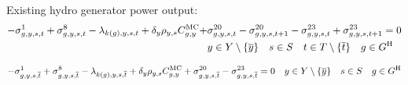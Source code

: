 \documentclass{article}
\begin{document}

Existing hydro generator power output:
\begin{align}
-\dMinPowerOutput + \dMaxPowerOutputHydro - \dPowerBalance[k(\iGenerator),\iYear,\iScenario,\iInterval] + \cDiscountRate \cScenarioDuration\cMarginalCost + & \dRampRateUp - \dRampRateUp[\iGenerator,\iYear,\iScenario,\iInterval + 1] - \dRampRateDown +  \dRampRateDown[\iGenerator,\iYear,\iScenario,\iInterval + 1] = 0 \nonumber\\ 
& \iYear \in \sYears \setminus \{\iYearTerminal\} \quad \iScenario \in \sScenarios \quad \iInterval \in \sIntervals \setminus \{\iIntervalTerminal\} \quad \iGenerator \in \sGeneratorsHydro
\end{align}

\begin{equation}
-\dMinPowerOutput[\iGenerator,\iYear,\iScenario,\iIntervalTerminal] + \dMaxPowerOutputHydro[\iGenerator,\iYear,\iScenario,\iIntervalTerminal] - \dPowerBalance[k(\iGenerator),\iYear,\iScenario,\iIntervalTerminal] + \cDiscountRate \cScenarioDuration \cMarginalCost + \dRampRateUp[\iGenerator,\iYear,\iScenario,\iIntervalTerminal] - \dRampRateDown[\iGenerator,\iYear,\iScenario,\iIntervalTerminal] = 0 \quad \iYear \in \sYears \setminus \{\iYearTerminal\} \quad \iScenario \in \sScenarios \quad \iGenerator \in \sGeneratorsHydro
\end{equation}
\end{document}
